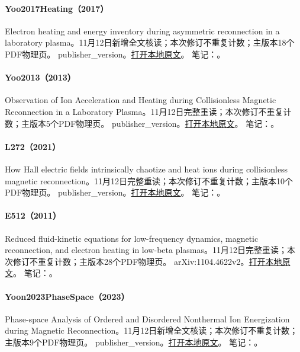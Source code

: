 \paragraph{Yoo2017Heating（2017）}\label{paper:Yoo2017Heating}
Electron heating and energy inventory during asymmetric reconnection in a laboratory plasma。11月12日新增全文核读；本次修订不重复计数；主版本18个PDF物理页。
publisher\_version。\href{run:../../papers/Yoo2017Heating.pdf}{打开本地原文}。
笔记：。\par\smallskip
\paragraph{Yoo2013（2013）}\label{paper:Yoo2013}
Observation of Ion Acceleration and Heating during Collisionless Magnetic Reconnection in a Laboratory Plasma。11月12日完整重读；本次修订不重复计数；主版本5个PDF物理页。
publisher\_version。\href{run:../../papers/Yoo2013.pdf}{打开本地原文}。
笔记：。\par\smallskip
\paragraph{L272（2021）}\label{paper:L272}
How Hall electric fields intrinsically chaotize and heat ions during collisionless magnetic reconnection。11月12日完整重读；本次修订不重复计数；主版本10个PDF物理页。
publisher\_version。\href{run:../../papers/L272_published.pdf}{打开本地原文}。
笔记：。\par\smallskip
\paragraph{E512（2011）}\label{paper:E512}
Reduced fluid-kinetic equations for low-frequency dynamics, magnetic reconnection, and electron heating in low-beta plasmas。11月12日完整重读；本次修订不重复计数；主版本28个PDF物理页。
arXiv:1104.4622v2。\href{run:../../papers/E512.pdf}{打开本地原文}。
笔记：。\par\smallskip
\paragraph{Yoon2023PhaseSpace（2023）}\label{paper:Yoon2023PhaseSpace}
Phase-space Analysis of Ordered and Disordered Nonthermal Ion Energization during Magnetic Reconnection。11月12日新增全文核读；本次修订不重复计数；主版本9个PDF物理页。
publisher\_version。\href{run:../../papers/Yoon2023PhaseSpace.pdf}{打开本地原文}。
笔记：。\par\smallskip
